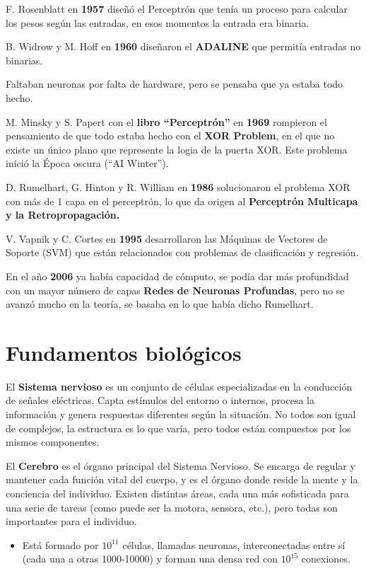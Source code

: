 \documentclass[12pt, twoside, openright]{report} %
\begin{document}
F. Rosenblatt en \textbf{1957} diseñó el Perceptrón que tenía un proceso para calcular los pesos según las entradas, en esos momentos la entrada era binaria.

B. Widrow y M. Hoff en \textbf{1960} diseñaron el \textbf{ADALINE} que permitía entradas no binarias.

Faltaban neuronas por falta de hardware, pero se pensaba que ya estaba todo hecho.

M. Minsky y S. Papert con el \textbf{libro “Perceptrón”} en \textbf{1969} rompieron el pensamiento de que todo estaba hecho con el \textbf{XOR Problem}, en el que no existe un único plano que represente la logia de la puerta XOR. Este problema inició la Época oscura (“AI Winter”).

D. Rumelhart, G. Hinton y R. William en \textbf{1986} solucionaron el problema XOR con más de 1 capa en el perceptrón, lo que da origen al \textbf{Perceptrón Multicapa y la Retropropagación.}

V. Vapnik y C. Cortes en \textbf{1995} desarrollaron las Máquinas de Vectores de Soporte (SVM) que están relacionados con problemas de clasificación y regresión.

En el año \textbf{2006} ya había capacidad de cómputo, se podía dar más profundidad con un mayor número de capas \textbf{Redes de Neuronas Profundas}, pero no se avanzó mucho en la teoría, se basaba en lo que había dicho Rumelhart.

\section{Fundamentos biológicos}
El \textbf{Sistema nervioso} es un conjunto de células especializadas en la conducción de señales eléctricas. Capta estímulos del entorno o internos, procesa la información y genera respuestas diferentes según la situación. No todos son igual de complejos, la estructura es lo que varía, pero todos están compuestos por los mismos componentes.

El \textbf{Cerebro} es el órgano principal del Sistema Nervioso. Se encarga de regular y mantener cada función vital del cuerpo, y es el órgano donde reside la mente y la conciencia del individuo. Existen distintas áreas, cada una más sofisticada para una serie de tareas (como puede ser la motora, sensora, etc.), pero todas son importantes para el individuo.
\begin{itemize}
	\item Está formado por $10^{11}$ células, llamadas neuronas, interconectadas entre sí (cada una a otras 1000-10000) y forman una densa red con $10^{15}$ conexiones.
\end{itemize}
\end{document}

